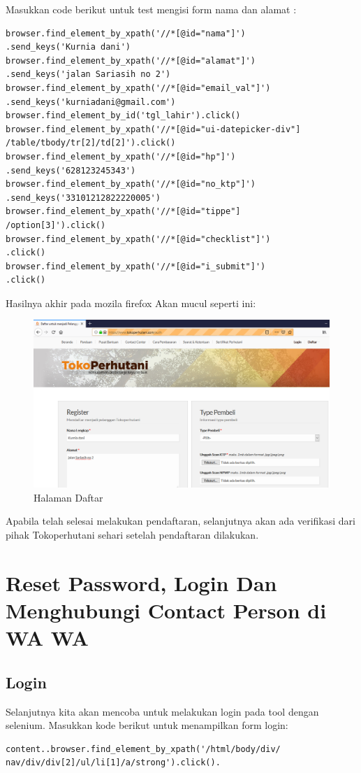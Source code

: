 Masukkan code berikut untuk test mengisi form nama dan alamat :
\begin{verbatim}
browser.find_element_by_xpath('//*[@id="nama"]')
.send_keys('Kurnia dani')
browser.find_element_by_xpath('//*[@id="alamat"]')
.send_keys('jalan Sariasih no 2')
browser.find_element_by_xpath('//*[@id="email_val"]')
.send_keys('kurniadani@gmail.com')
browser.find_element_by_id('tgl_lahir').click()
browser.find_element_by_xpath('//*[@id="ui-datepicker-div"]
/table/tbody/tr[2]/td[2]').click()
browser.find_element_by_xpath('//*[@id="hp"]')
.send_keys('628123245343')
browser.find_element_by_xpath('//*[@id="no_ktp"]')
.send_keys('33101212822220005')
browser.find_element_by_xpath('//*[@id="tippe"]
/option[3]').click()
browser.find_element_by_xpath('//*[@id="checklist"]')
.click()
browser.find_element_by_xpath('//*[@id="i_submit"]')
.click()
\end{verbatim}

\newpage
Hasilnya akhir pada mozila firefox Akan mucul seperti ini:
\begin{figure}[h]
	\centering
	\includegraphics[scale=0.24]{figures/4daftar}
	\caption{Halaman Daftar}
\end{figure}

Apabila telah selesai melakukan pendaftaran, selanjutnya akan ada verifikasi dari pihak Tokoperhutani sehari setelah pendaftaran dilakukan.

\newpage
\section{Reset Password, Login Dan Menghubungi Contact Person di WA WA}
\subsection{Login}
Selanjutnya kita akan mencoba untuk melakukan login pada tool dengan selenium. 
Masukkan kode berikut untuk menampilkan form login:
\begin{verbatim}
content..browser.find_element_by_xpath('/html/body/div/
nav/div/div[2]/ul/li[1]/a/strong').click().
\end{verbatim}




